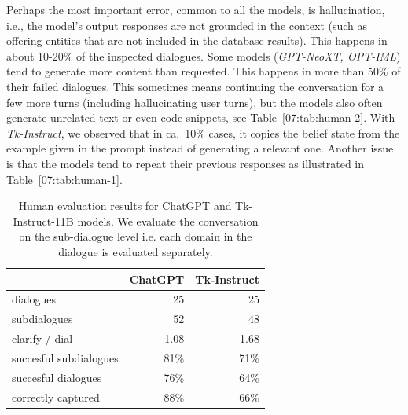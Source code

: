 Perhaps the most important error, common to all the models, is hallucination, i.e., the model's output responses are not grounded in the context (such as offering entities that are not included in the database results). This happens in about 10-20\% of the inspected dialogues.
Some models (\emph{GPT-NeoXT, OPT-IML}) tend to generate more content than requested.
This happens in more than 50\% of their failed dialogues.
This sometimes means continuing the conversation for a few more turns (including hallucinating user turns), but the models also often generate unrelated text or even code snippets, see Table~\ref{07:tab:human-2}.
With \emph{Tk-Instruct}, we observed that in ca.~10\% cases, it copies the belief state from the example given in the prompt instead of generating a relevant one.
Another issue is that the models tend to repeat their previous responses as illustrated in Table~\ref{07:tab:human-1}.
\begin{table}[tp]
    \centering\small
    \begin{tabular}{l|r|r}
    \toprule
    & \textbf{ChatGPT} & \textbf{Tk-Instruct} \\
    \midrule
    dialogues & 25 & 25 \\
    subdialogues & 52 & 48 \\
    clarify / dial & 1.08 & 1.68 \\
    succesful subdialogues & 81\% & 71\% \\
    succesful dialogues & 76\% & 64\% \\
    correctly captured & 88\% & 66\% \\
    \bottomrule
    
    
    \end{tabular}
    \caption{Human evaluation results for ChatGPT and Tk-Instruct-11B models. We evaluate the conversation on the sub-dialogue level i.e. each domain in the dialogue is evaluated separately. }
    \label{tab:human}
\end{table}

